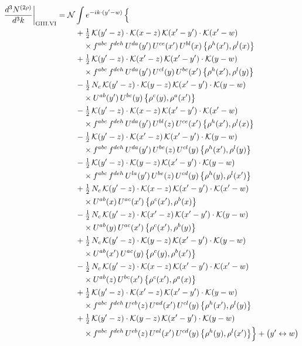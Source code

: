 \documentclass[10pt]{article}
\numberwithin{equation}{section}
\newcommand{\KK}{\mathcal K}
\newcommand{\NN}{\mathcal N}
\begin{document}
\begin{align}
\frac{d^3N^{(2\rho)}}{d^3k}\bigg|_{\rm GIII.VI}={}&\NN\int e^{-ik\cdot(y'-w)}\,\Big\{\notag\\
&\quad +\tfrac12\,\KK(y'-z)\cdot\KK(x-z)\,\KK(x'-y')\cdot\KK(x'-w)\notag\\
&\qquad\times f^{abc}\,f^{deh}\,U^{da}(y')\,U^{ce}(x')\,U^{bl}(x)\,\big\{\rho^{h}(x'),\rho^{l}(x)\big\}\notag\\
&\quad +\tfrac12\,\KK(y'-z)\cdot\KK(x'-z)\,\KK(x'-y')\cdot\KK(y-w)\notag\\
&\qquad\times f^{abc}\,f^{deh}\,U^{da}(y')\,U^{cl}(y)\,U^{be}(x')\,\big\{\rho^{h}(x'),\rho^{l}(y)\big\}\notag\\
&\quad -\tfrac12\,N_{c}\,\KK(y'-z)\cdot\KK(y-z)\,\KK(x'-y')\cdot\KK(y-w)\notag\\
&\qquad\times U^{ab}(y')\,U^{bc}(y)\,\big\{\rho^{c}(y),\rho^{a}(x')\big\}\notag\\
&\quad -\tfrac12\,\KK(y'-z)\cdot\KK(x-z)\,\KK(x'-y')\cdot\KK(x'-w)\notag\\
&\qquad\times f^{abc}\,f^{deh}\,U^{da}(y')\,U^{bl}(z)\,U^{ce}(x')\,\big\{\rho^{h}(x'),\rho^{l}(x)\big\}\notag\\
&\quad -\tfrac12\,\KK(y'-z)\cdot\KK(x'-z)\,\KK(x'-y')\cdot\KK(y-w)\notag\\
&\qquad\times f^{abc}\,f^{deh}\,U^{da}(y')\,U^{be}(z)\,U^{cl}(y)\,\big\{\rho^{h}(x'),\rho^{l}(y)\big\}\notag\\
&\quad -\tfrac12\,\KK(y'-z)\cdot\KK(y-z)\,\KK(x'-y')\cdot\KK(y-w)\notag\\
&\qquad\times f^{abc}\,f^{deh}\,U^{la}(y')\,U^{be}(z)\,U^{cd}(y)\,\big\{\rho^{h}(y),\rho^{l}(x')\big\}\notag\\
&\quad +\tfrac12\,N_{c}\,\KK(y'-z)\cdot\KK(x-z)\,\KK(x'-y')\cdot\KK(x'-w)\notag\\
&\qquad\times U^{ab}(x)\,U^{ac}(x')\,\big\{\rho^{c}(x'),\rho^{b}(x)\big\}\notag\\
&\quad -\tfrac12\,N_{c}\,\KK(y'-z)\cdot\KK(x'-z)\,\KK(x'-y')\cdot\KK(y-w)\notag\\
&\qquad\times U^{ab}(y)\,U^{ac}(x')\,\big\{\rho^{c}(x'),\rho^{b}(y)\big\}\notag\\
&\quad +\tfrac12\,N_{c}\,\KK(y'-z)\cdot\KK(y-z)\,\KK(x'-y')\cdot\KK(y-w)\notag\\
&\qquad\times U^{ab}(x')\,U^{ac}(y)\,\big\{\rho^{c}(y),\rho^{b}(x')\big\}\notag\\
&\quad -\tfrac12\,N_{c}\,\KK(y'-z)\cdot\KK(x-z)\,\KK(x'-y')\cdot\KK(x'-w)\notag\\
&\qquad\times U^{ab}(z)\,U^{bc}(x')\,\big\{\rho^{c}(x'),\rho^{a}(x)\big\}\notag\\
&\quad +\tfrac12\,\KK(y'-z)\cdot\KK(x'-z)\,\KK(x'-y')\cdot\KK(y-w)\notag\\
&\qquad\times f^{abc}\,f^{deh}\,U^{eb}(z)\,U^{ad}(x')\,U^{cl}(y)\,\big\{\rho^{h}(x'),\rho^{l}(y)\big\}\notag\\
&\quad +\tfrac12\,\KK(y'-z)\cdot\KK(y-z)\,\KK(x'-y')\cdot\KK(y-w)\notag\\
&\qquad\times f^{abc}\,f^{deh}\,U^{eb}(z)\,U^{al}(x')\,U^{cd}(y)\,\big\{\rho^{h}(y),\rho^{l}(x')\big\}\Big\}+\big(y'\leftrightarrow w\big)\label{R:eq:sum-GIII.VI}
\end{align}
\end{document}

